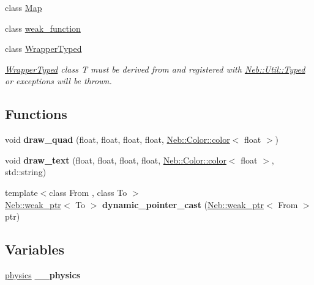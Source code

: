 \begin{DoxyCompactItemize}
class \hyperlink{classNeb_1_1Map}{\-Map}
\item 
class \hyperlink{classNeb_1_1weak__function}{weak\-\_\-function}
\item 
class \hyperlink{classNeb_1_1WrapperTyped}{\-Wrapper\-Typed}
\begin{DoxyCompactList}\small\item\em \hyperlink{classNeb_1_1WrapperTyped}{\-Wrapper\-Typed} class \-T must be derived from and registered with \hyperlink{classNeb_1_1Util_1_1Typed}{\-Neb\-::\-Util\-::\-Typed} or exceptions will be thrown. \end{DoxyCompactList}\end{DoxyCompactItemize}
\subsection*{\-Functions}
\begin{DoxyCompactItemize}
\item 
\hypertarget{namespaceNeb_a8ebdfeffa1def13492f72074015c2876}{void {\bfseries draw\-\_\-quad} (float, float, float, float, \hyperlink{classNeb_1_1Color_1_1color}{\-Neb\-::\-Color\-::color}$<$ float $>$)}\label{namespaceNeb_a8ebdfeffa1def13492f72074015c2876}

\item 
\hypertarget{namespaceNeb_a7daf427c7b6f28a6da236451dc42f6d1}{void {\bfseries draw\-\_\-text} (float, float, float, float, \hyperlink{classNeb_1_1Color_1_1color}{\-Neb\-::\-Color\-::color}$<$ float $>$, std\-::string)}\label{namespaceNeb_a7daf427c7b6f28a6da236451dc42f6d1}

\item 
\hypertarget{namespaceNeb_a4ed152a7fe9e22a11580d60f1d14b2d2}{{\footnotesize template$<$class From , class To $>$ }\\\hyperlink{classNeb_1_1weak__ptr}{\-Neb\-::weak\-\_\-ptr}$<$ \-To $>$ {\bfseries dynamic\-\_\-pointer\-\_\-cast} (\hyperlink{classNeb_1_1weak__ptr}{\-Neb\-::weak\-\_\-ptr}$<$ \-From $>$ ptr)}\label{namespaceNeb_a4ed152a7fe9e22a11580d60f1d14b2d2}

\end{DoxyCompactItemize}
\subsection*{\-Variables}
\begin{DoxyCompactItemize}
\item 
\hypertarget{namespaceNeb_a16bff826fe3b967c09a5f37850d60ee5}{\hyperlink{classNeb_1_1physics}{physics} {\bfseries \-\_\-\-\_\-physics}}\label{namespaceNeb_a16bff826fe3b967c09a5f37850d60ee5}

\end{DoxyCompactItemize}


